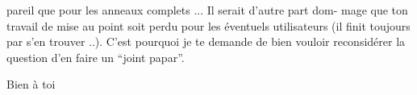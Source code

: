 
pareil que pour les anneaux complets ... Il serait d'autre part dom-%
mage que ton travail de mise au point soit perdu pour les éventuels
utilisateurs (il finit toujours par s'en trouver ..). C'est pourquoi
je te demande de bien vouloir reconsidérer la question d'en faire un
``joint papar''.



Bien à toi

